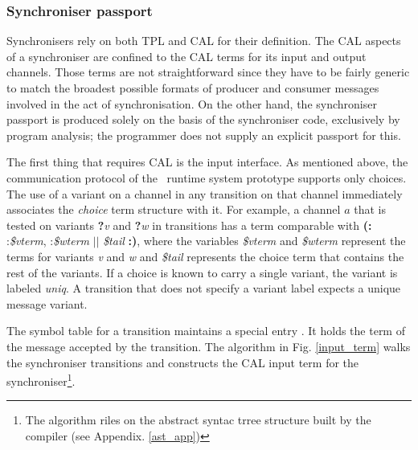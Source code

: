   \subsubsection{Synchroniser passport}
Synchronisers rely on both TPL and CAL for their definition. The CAL aspects of a synchroniser are confined to the CAL terms for its input and output channels. Those terms are not straightforward since they have to be fairly generic to match the broadest possible formats of producer and consumer messages involved in the act of synchronisation. On the other hand, the synchroniser passport is produced solely on the basis of the synchroniser code, exclusively by program analysis; the programmer does not supply an explicit passport for this.

The first thing that requires CAL is the input interface. As mentioned above, the communication protocol of the \ak\ runtime system prototype supports only choices. The use of a variant on a channel in any transition on that channel immediately associates the \emph{choice} term structure with it. For example, a channel $a$ that is tested on variants \textbf{?}\emph{v} and \textbf{?}\emph{w} in transitions has a term comparable with \textbf{(:} :\emph{\$vterm}, :\emph{\$wterm} $||$ \emph{\$tail} \textbf{:)}, where the variables \emph{\$vterm} and \emph{\$wterm} represent the terms for variants \emph{v} and \emph{w} and \emph{\$tail} represents the choice term that contains the rest of the variants. If a choice is known to carry a single variant, the variant is labeled \emph{uniq}. A transition that does not specify a variant label expects a unique message variant.

The symbol table for a transition maintains a special entry . It holds the term of the message accepted by the transition. The algorithm in Fig. \ref{input_term} walks the synchroniser transitions and constructs the CAL input term for the synchroniser\footnote{The algorithm riles on the abstract syntac trree structure built by the compiler (see Appendix. \ref{ast_app})}.

